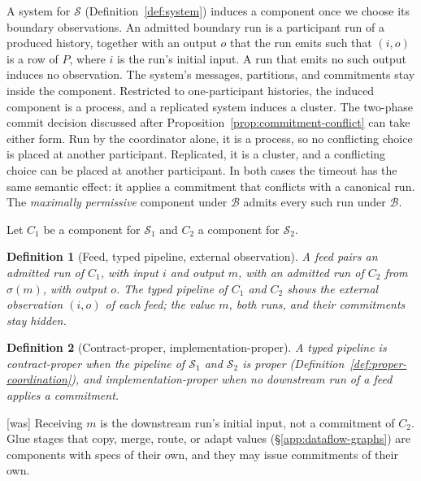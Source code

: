 \documentclass[sigconf]{cidr-2027}
\newtheorem{definition}{Definition}
\theoremstyle{remark}
\newcommand{\commitment}{commitment\xspace}
\newcommand{\commitments}{commitments\xspace}
\newcommand{\Spec}{\mathcal{S}}
\begin{document}
\color{blue!70!black}A system for $\Spec$ (Definition~\ref{def:system}) induces a component once
we choose its boundary observations.  An admitted boundary run is a
participant run of a produced history, together with an output $o$ that the
run emits such that $(i,o)$ is a row of $P$, where $i$ is the run's initial
input.  A run that emits no such output induces no observation.  The system's messages,
partitions, and \commitments stay inside the component.  Restricted to
one-participant histories, the induced component is a process, and a
replicated system induces a cluster.  The two-phase commit decision discussed
after Proposition~\ref{prop:commitment-conflict} can take either form.  Run by the coordinator alone, it is a process, so no conflicting
choice is placed at another participant.  Replicated, it is a cluster, and a
conflicting choice can be placed at another participant.  In both cases the
timeout has the same semantic effect: it applies a \commitment that conflicts
with a canonical run.  The \emph{maximally permissive} component under $\mathcal B$
admits every such run under $\mathcal B$.\color{black}

Let $C_1$ be a component for $\Spec_1$ and $C_2$ a component for $\Spec_2$.

\begin{definition}[Feed, typed pipeline, external observation]
\label{def:typed-pipeline}
A \emph{feed} pairs an admitted run of $C_1$, with input $i$ and output $m$,
with an admitted run of $C_2$ from $\sigma(m)$, with output $o$.  The
\emph{typed pipeline} of $C_1$ and $C_2$ shows the \emph{external
observation} $(i,o)$ of each feed; the value $m$, both runs, and their
\commitments stay hidden.
\end{definition}

\begin{definition}[Contract-proper, implementation-proper]
\label{def:proper-pipeline}
A typed pipeline is \emph{contract-proper} when the pipeline of $\Spec_1$
and $\Spec_2$ is proper (Definition~\ref{def:proper-coordination}), and
\emph{implementation-proper} when no downstream run of a feed applies a
\commitment.
\end{definition}



{\footnotesize\color{black!50}\noindent\textsf{[was]} Receiving $m$ is the downstream run's initial input, not a \commitment of
$C_2$.  Glue stages that copy, merge, route, or adapt values
(\S\ref{app:dataflow-graphs}) are components with specs of
their own, and they may issue \commitments of their own.\par}
\end{document}

